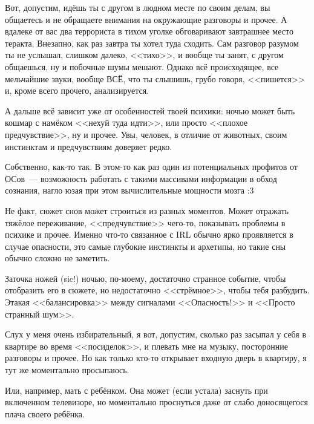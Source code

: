 \documentclass[a4paper,14pt,oneside]{memoir}
\begin{document}
Вот, допустим, идёшь ты с другом в людном месте по своим делам, вы общаетесь и не обращаете внимания на окружающие разговоры и прочее. А вдалеке от вас два террориста в тихом уголке обговаривают завтрашнее место теракта. Внезапно, как раз завтра ты хотел туда сходить. Сам разговор разумом ты не услышал, слишком далеко, <<тихо>>, и вообще ты занят, с другом общаешься, ну и побочные шумы мешают. Однако всё происходящее, все мельчайшие звуки, вообще ВСЁ, что ты слышишь, грубо говоря, <<пишется>> и, кроме всего прочего, анализируется.

А дальше всё зависит уже от особенностей твоей психики: ночью может быть кошмар с намёком <<нехуй туда идти>>, или просто <<плохое предчувствие>>, ну и прочее. Увы, человек, в отличие от животных, своим инстинктам и предчувствиям доверяет редко. 

Собственно, как-то так. В этом-то как раз один из потенциальных профитов от ОСов~--- возможность работать с такими массивами информации в обход сознания, нагло юзая при этом вычислительные мощности мозга :3

\bigskip


\medskip
Не факт, сюжет снов может строиться из разных моментов. Может отражать тяжёлое переживание, <<предчувствие>> чего-то, показывать проблемы в психике и прочее. Именно что-то связанное с IRL обычно ярко проявляется в случае опасности, это самые глубокие инстинкты и архетипы, но такие сны обычно сложно не заметить.
 
Заточка ножей (sic!) ночью, по-моему, достаточно странное событие, чтобы отобразить его в сюжете, но недостаточно <<стрёмное>>, чтобы тебя разбудить. Этакая <<балансировка>> между сигналами <<Опасность!>> и <<Просто странный шум>>.

Слух у меня очень избирательный, я вот, допустим, сколько раз засыпал у себя в квартире во время <<посиделок>>, и плевать мне на музыку, посторонние разговоры и прочее. Но как только кто-то открывает входную дверь в квартиру, я тут же моментально просыпаюсь. 

Или, например, мать с ребёнком. Она может (если устала) заснуть при включенном телевизоре, но моментально проснуться даже от слабо доносящегося плача своего ребёнка. 
\end{document}
